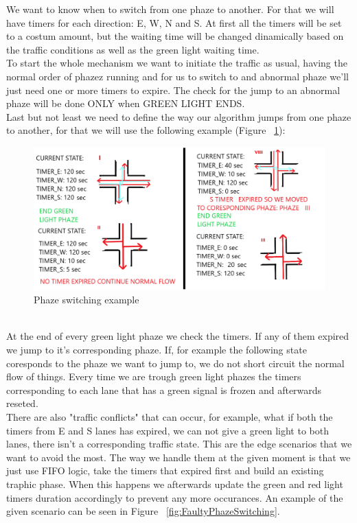 \documentclass[17pt]{report}
\begin{document}
\indent \indent
We want to know when to switch from one phaze to another. For that we will have
timers for each direction: E, W, N and S. At first all the timers will be set to 
a costum amount, but the waiting time will be changed dinamically based on the 
traffic conditions as well as the green light waiting time.\\
\indent \indent
To start the whole mechanism we want to initiate the traffic as usual, 
having the normal order of phazez running and for us to switch to and abnormal 
phaze we'll just need one or more timers to expire. The check for the jump to an abnormal phaze
will be done ONLY when GREEN LIGHT ENDS.\\
\indent \indent
Last but not least we need to define the way our algorithm jumps from one phaze to 
another, for that we will use the following example
(Figure ~\ref{fig:PhazesSwitchingExample}):
\begin{figure}[h!]
    \includegraphics[width=\textwidth]{Sketches/SwitchingTroughPhazesExample.png}
    \caption{Phaze switching example}
    \label{fig:PhazesSwitchingExample}
\end{figure}
\\
\indent \indent
At the end of every green light phaze we check the timers. If any of 
them expired we jump to it's corresponding phaze. If, for example the following state
coresponds to the phaze we want to jump to, we do not short circuit the normal flow of
things. Every time we are trough green light phazes the timers corresponding to 
each lane that has a green signal is frozen and afterwards reseted.\\
\indent \indent
There are also "traffic conflicts" that can occur, for example, what if 
both the timers from E and S lanes has expired, we can not give a green light 
to both lanes, there isn't a corresponding traffic state. This are the edge 
scenarios that we want to avoid the most. The way we handle them at the given moment is 
that we just use FIFO logic, take the timers that expired first and build an existing traphic 
phase. When this happens we afterwards update the green and red light timers 
duration accordingly to prevent any more occurances. An example of the given 
scenario can be seen in Figure ~\ref{fig:FaultyPhazeSwitching}. 
\end{document}
